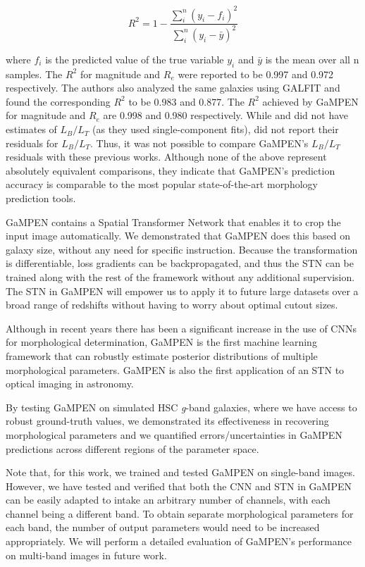 \documentclass[twocolumn]{aastex63}
\newcommand\gampen{GaMPEN}
\begin{document}
\begin{CJK*}{UTF8}{gbsn}
\begin{equation}
R^{2}=1-\frac{\sum_{i}^{n}\left(y_{i}-f_{i}\right)^{2}}{\sum_{i}^{n}\left(y_{i}-\bar{y}\right)^{2}}
\end{equation}

where $f_i$ is the predicted value of the true variable $y_i$ and $\bar{y}$ is the mean over all n samples. The $R^2$ for magnitude and $R_e$ were reported to be 0.997 and 0.972 respectively. The authors also analyzed the same galaxies using GALFIT and found the corresponding $R^2$ to be 0.983 and 0.877. The $R^2$ achieved by \gampen{} for magnitude and $R_e$ are 0.998 and 0.980 respectively. While \citet{haussler_07} and \citet{Tuccillo2018DeepFitting} did not have estimates of $L_B/L_T$ (as they used single-component fits), \citet{meert_13} did not report their residuals for $L_B/L_T$. Thus, it was not possible to compare \gampen{}'s $L_B/L_T$ residuals with these previous works. Although none of the above represent absolutely equivalent comparisons, they indicate that \gampen{}'s prediction accuracy is comparable to the most popular state-of-the-art morphology prediction tools.

\gampen{} contains a Spatial Transformer Network that enables it to crop the input image automatically. We demonstrated that \gampen{} does this based on galaxy size, without any need for specific instruction. %
Because the transformation is differentiable, loss gradients can be backpropagated, and thus the STN can be trained along with the rest of the framework without any additional supervision. The STN in \gampen{} will empower us to apply it to future large datasets over a broad range of redshifts without having to worry about optimal cutout sizes.  

Although in recent years there has been a significant increase in the use of CNNs for morphological determination, \gampen{} is the first machine learning framework that can robustly estimate posterior distributions of multiple morphological parameters. \gampen{} is also the first application of an STN to optical imaging in astronomy. 

By testing \gampen{} on simulated HSC \textit{g}-band galaxies, where we have access to robust ground-truth values, we demonstrated its effectiveness in recovering morphological parameters and we quantified errors/uncertainties in \gampen{} predictions across different regions of the parameter space. 

Note that, for this work, we trained and tested \gampen{} on single-band images. However, we have tested and verified that both the CNN and STN in \gampen{} can be easily adapted to intake an arbitrary number of channels, with each channel being a different band. To obtain separate morphological parameters for each band, the number of output parameters would need to be increased appropriately. We will perform a detailed evaluation of \gampen{}'s performance on multi-band images in future work.


\end{CJK*}
\end{document}
